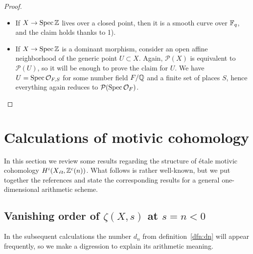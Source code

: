 \documentclass{article}
\numberwithin{equation}{section}
\begin{document}
\begin{lemma}
\begin{proof}
    \begin{itemize}
    \item If $X \to \Spec \ZZ$ lives over a closed point, then it is a smooth
      curve over $\FF_q$, and the claim holds thanks to 1).

    \item If $X \to \Spec \ZZ$ is a dominant morphism, consider an open affine
      neighborhood of the generic point $U \subset X$. Again, $\mathcal{P} (X)$
      is equivalent to $\mathcal{P} (U)$, so it will be enough to prove the
      claim for $U$. We have $U = \Spec \mathcal{O}_{F,S}$ for some number field
      $F/\QQ$ and a finite set of places $S$, hence everything again reduces to
      $\mathcal{P} (\Spec \mathcal{O}_F)$. \qedhere
    \end{itemize}
  \end{proof}
\end{lemma}


\section{Calculations of motivic cohomology}
\label{sec:motivic-cohomology-structure}

In this section we review some results regarding the structure of étale motivic
cohomology $H^i (X_\et, \ZZ^c(n))$. What follows is rather well-known, but we
put together the references and state the corresponding results for a general
one-dimensional arithmetic scheme.

\subsection*{Vanishing order of $\zeta (X,s)$ at $s = n < 0$}

In the subsequent calculations the number $d_n$ from definition~\ref{dfn:dn}
will appear frequently, so we make a digression to explain its arithmetic
meaning.
\end{document}
